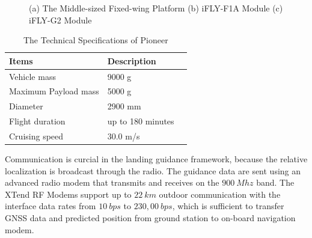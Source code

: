 \documentclass[journal,article,submit,moreauthors,pdftex,10pt,a4paper]{mdpi}
\begin{document}
\begin{figure}[!tb]
	\centering
	\caption{(a) The Middle-sized Fixed-wing Platform (b) iFLY-F1A Module   (c) iFLY-G2 Module}
\end{figure}



\begin{table}
	\caption{The Technical Specifications of Pioneer}
	\label{tab:platform_specifications}
	\begin{center}
		\renewcommand{\arraystretch}{1.1}
		\begin{tabular}{lll}
			\hline
			\textbf {Items}  & \textbf{Description} \\
			\hline
			Vehicle mass & 9000 g \\
			Maximum Payload mass & 5000 g \\
			Diameter & 2900 mm \\
			Flight duration & up to 180 minutes \\
			Cruising speed & 30.0 m/s \\
			\hline
		\end{tabular}
	\end{center}
\end{table}

Communication is curcial in the landing guidance framework, because the relative localization is broadcast through the radio. The guidance data are sent using an advanced radio modem that transmits and receives on the $900\ Mhz$ band. The XTend RF Modems support up to $22\ km$ outdoor communication with the interface data rates from $10\ bps$ to $230,00\ bps$, which is sufficient to transfer GNSS data and predicted position from ground station to on-board navigation modem. 
\end{document}
